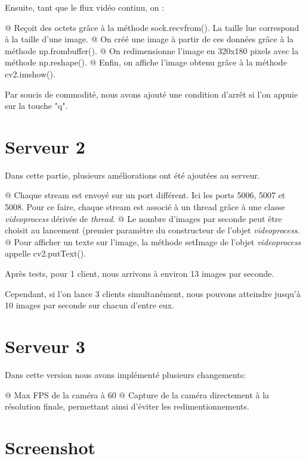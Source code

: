 \documentclass{report}
\begin{document}
			Ensuite, tant que le flux vidéo continu, on :
			\begin{easylist}[itemize]
				@ Reçoit des octets grâce à la méthode sock.recvfrom(). La taille lue correspond à la taille d'une image.
				@ On créé une image à partir de ces données grâce à la méthode np.frombuffer().
				@ On redimensionne l'image en 320x180 pixels avec la méthode np.reshape().
				@ Enfin, on affiche l'image obtenu grâce à la méthode cv2.imshow().
			\end{easylist}
	
			Par soucis de commodité, nous avons ajouté une condition d'arrêt si l'on appuie sur la touche "q".
	
		\section{Serveur 2}
			Dans cette partie, plusieurs améliorations ont été ajoutées au serveur.
	
			\begin{easylist}[itemize]
				@ Chaque stream est envoyé sur un port différent. Ici les ports 5006, 5007 et 5008. Pour ce faire, chaque stream est associé à un thread grâce à une classe \textit{videoprocess} dérivée de \textit{thread}.
				@ Le nombre d'images par seconde peut être choisit au lancement (premier paramètre du constructeur de l'objet \textit{videoprocess}.
				@ Pour afficher un texte sur l'image, la méthode setImage de l'objet \textit{videoprocess} appelle cv2.putText().
			\end{easylist}
	
			Après tests, pour 1 client, nous arrivons à environ 13 images par seconde.
			
			Cependant, si l'on lance 3 clients simultanément, nous pouvons atteindre jusqu'à 10 images par seconde sur chacun d'entre eux.
			
		\section{Serveur 3}
			Dans cette version nous avons implémenté plusieurs changements:
			\begin{easylist}[itemize]
				@ Max FPS de la caméra à 60
				@ Capture de la caméra directement à la résolution finale, permettant ainsi d'éviter les redimentionnements.
			\end{easylist}
		
		\section{Screenshot}
		
\end{document}
